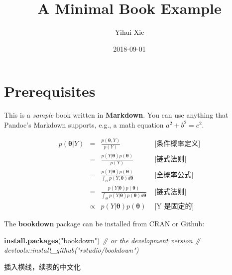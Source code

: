 \documentclass[]{book}
\title{A Minimal Book Example}
\author{Yihui Xie}
\date{2018-09-01}
\newenvironment{Shaded}{\begin{snugshade}}{\end{snugshade}}
\newcommand{\CommentTok}[1]{\textcolor[rgb]{0.56,0.35,0.01}{\textit{#1}}}
\newcommand{\KeywordTok}[1]{\textcolor[rgb]{0.13,0.29,0.53}{\textbf{#1}}}
\newcommand{\NormalTok}[1]{#1}
\newcommand{\StringTok}[1]{\textcolor[rgb]{0.31,0.60,0.02}{#1}}
\begin{document}
\maketitle

{
\hypersetup{linkcolor=black}
\setcounter{tocdepth}{1}
\tableofcontents
}
\hypertarget{prerequisites}{%
\chapter{Prerequisites}\label{prerequisites}}

This is a \emph{sample} book written in \textbf{Markdown}. You can use
anything that Pandoc's Markdown supports, e.g., a math equation
\(a^2 + b^2 = c^2\).

\[
\begin{array}{rcll}
p(\boldsymbol{\theta}|Y)  & =  & \displaystyle \frac{p(\boldsymbol{\theta},Y)}{p(Y)}
& \mbox{ [条件概率定义]}
\\[4pt]
& = & \displaystyle \frac{p(Y|\boldsymbol{\theta}) p(\boldsymbol{\theta})}{p(Y)}
& \mbox{ [链式法则]}
\\[4pt]
& = & \displaystyle \frac{p(Y|\boldsymbol{\theta})p(\boldsymbol{\theta})}{\int_{\Theta}p(Y,\boldsymbol{\theta})d\boldsymbol{\theta}}
& \mbox{ [全概率公式]}
\\[4pt]
& = & \displaystyle \frac{p(Y|\boldsymbol{\theta})p(\boldsymbol{\theta})}{\int_{\Theta}p(Y|\boldsymbol{\theta})p(\boldsymbol{\theta})d\boldsymbol{\theta}}
& \mbox{ [链式法则]}
\\[4pt]
& \propto & \displaystyle p(Y|\boldsymbol{\theta})p(\boldsymbol{\theta})
& \mbox{ [Y 是固定的]}
\end{array}
\]

The \textbf{bookdown} package can be installed from CRAN or Github:

\begin{Shaded}
\begin{Highlighting}[]
\KeywordTok{install.packages}\NormalTok{(}\StringTok{"bookdown"}\NormalTok{)}
\CommentTok{# or the development version}
\CommentTok{# devtools::install_github("rstudio/bookdown")}
\end{Highlighting}
\end{Shaded}

插入横线，续表的中文化
\end{document}
